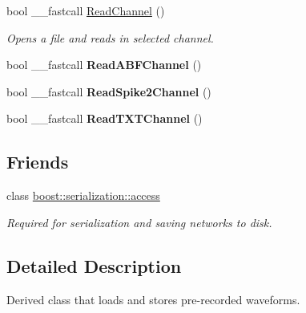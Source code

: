\begin{DoxyCompactItemize}
\item 
\hypertarget{class_t_playback_waveform_a2e58a7db9903e5acba89276c18989650}{bool \+\_\+\+\_\+fastcall \hyperlink{class_t_playback_waveform_a2e58a7db9903e5acba89276c18989650}{Read\+Channel} ()}\label{class_t_playback_waveform_a2e58a7db9903e5acba89276c18989650}

\begin{DoxyCompactList}\small\item\em Opens a file and reads in selected channel. \end{DoxyCompactList}\item 
\hypertarget{class_t_playback_waveform_a84ad70c7b8ced225181e0c5df4be8bf8}{bool \+\_\+\+\_\+fastcall {\bfseries Read\+A\+B\+F\+Channel} ()}\label{class_t_playback_waveform_a84ad70c7b8ced225181e0c5df4be8bf8}

\item 
\hypertarget{class_t_playback_waveform_a5a941c10a01e663e36319261c9e3ee51}{bool \+\_\+\+\_\+fastcall {\bfseries Read\+Spike2\+Channel} ()}\label{class_t_playback_waveform_a5a941c10a01e663e36319261c9e3ee51}

\item 
\hypertarget{class_t_playback_waveform_a5164152e6e6af417c58ec1711eeb4c97}{bool \+\_\+\+\_\+fastcall {\bfseries Read\+T\+X\+T\+Channel} ()}\label{class_t_playback_waveform_a5164152e6e6af417c58ec1711eeb4c97}

\end{DoxyCompactItemize}
\subsection*{Friends}
\begin{DoxyCompactItemize}
\item 
\hypertarget{class_t_playback_waveform_ac98d07dd8f7b70e16ccb9a01abf56b9c}{class \hyperlink{class_t_playback_waveform_ac98d07dd8f7b70e16ccb9a01abf56b9c}{boost\+::serialization\+::access}}\label{class_t_playback_waveform_ac98d07dd8f7b70e16ccb9a01abf56b9c}

\begin{DoxyCompactList}\small\item\em Required for serialization and saving networks to disk. \end{DoxyCompactList}\end{DoxyCompactItemize}


\subsection{Detailed Description}
Derived class that loads and stores pre-\/recorded waveforms. 

